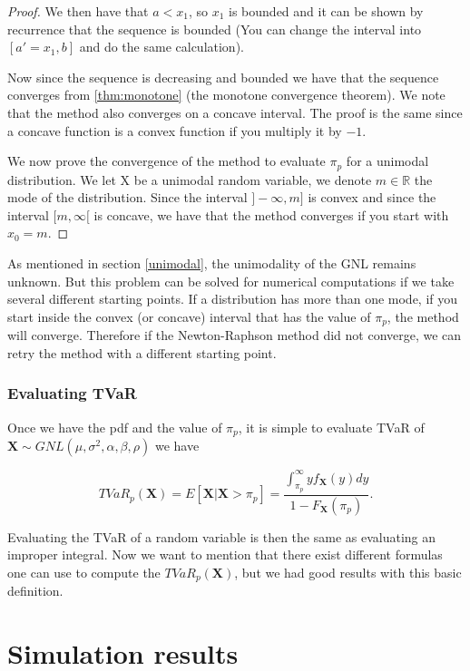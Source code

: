 \documentclass[12pt,travaildirige,nobabel, twoside]{dms}
\numberwithin{equation}{section}
\numberwithin{table}{chapter}
\numberwithin{figure}{chapter}
\begin{document}
\begin{proof}
We then have that $a<x_1$, so $x_1$ is bounded and it can be shown by recurrence that the sequence is bounded (You can change the interval into $[a'=x_1,b]$ and do the same calculation).

Now since the sequence is decreasing and bounded we have that the sequence converges from  \ref{thm:monotone} (the monotone convergence theorem). We note that the method also converges on a concave interval. The proof is the same since a concave function is a convex function if you multiply it by $-1$.

\bigskip
We now prove the convergence of the method to evaluate $\pi_p$ for a unimodal distribution. We let X be a unimodal random variable, we denote $ m\in\mathbb{R}$ the mode of the distribution. Since the interval $]-\infty,m]$ is convex and since the interval $[m,\infty[$ is concave, we have that the method converges if you start with $x_0=m$.


\end{proof}

As mentioned in section \ref{unimodal}, the unimodality of the GNL remains unknown. But this problem can be solved for numerical computations if we take several different starting points. If a distribution has more than one mode, if you start inside the convex (or concave) interval that has the value of $\pi_p$, the method will converge. Therefore if the Newton-Raphson method did not converge, we can retry the method with a different starting point.\\


\subsection{Evaluating TVaR}

Once we have the pdf and the value of $\pi_p$, it is simple to evaluate TVaR of $\textbf{X}\sim GNL(\mu,\sigma^2,\alpha,\beta,\rho)$ we have

\begin{equation}\label{eq:tvar}TVaR_p(\textbf{X})=E[\textbf{X}| \textbf{X}>\pi_p ]= \frac{\int_{\pi_p}^{\infty}yf_\textbf{X}(y)dy}{1-F_\textbf{X}(\pi_p)}.\end{equation}

Evaluating the TVaR of a random variable is then the same as evaluating an improper integral. Now we want to mention that there exist different formulas one can use to compute the $TVaR_p(\textbf{X})$, but we had good results with this basic definition. 


\chapter{Simulation results}
\end{document}
